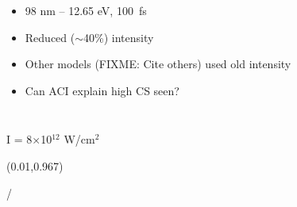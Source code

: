 \documentclass{beamer}
\makeatletter
\newcommand{\framenumber}{
\begin{textblock}{0}(0.01,0.967)
\begin{scriptsize}
{\color{gray}\insertframenumber/\inserttotalframenumber}
\end{scriptsize}
\end{textblock}
}
\makeatother
\begin{document}
\begin{frame}{}
\begin{columns}
        \begin{itemize}
            \item<1-> 98 nm -- 12.65 eV, 100~fs
            \item<2-> Reduced ($\sim$40\%) intensity
            \item<3-> Other models (FIXME: Cite others) used old intensity
            \item<3-> Can ACI explain high CS seen?
        \end{itemize}

    \end{columns}
\end{frame}

\begin{frame}{I = 8$\times$10$^{12}$ W/cm$^2$}\framenumber
{}
\begin{columns}
    \begin{center}{}\end{center}
    \begin{center}{}\end{center}

\end{columns}
\end{frame}
\end{document}
